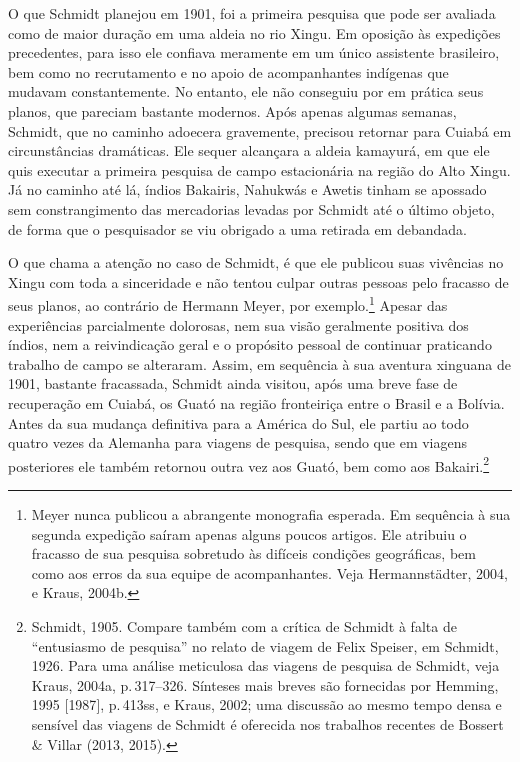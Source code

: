 O que Schmidt planejou em 1901, foi a primeira pesquisa que pode ser
avaliada como de maior duração em uma aldeia no rio Xingu. Em oposição
às expedições precedentes, para isso ele confiava meramente em um único
assistente brasileiro, bem como no recrutamento e no apoio de
acompanhantes indígenas que mudavam constantemente. No entanto, ele não
conseguiu por em prática seus planos, que pareciam bastante modernos.
Após apenas algumas semanas, Schmidt, que no caminho adoecera
gravemente, precisou retornar para Cuiabá em circunstâncias dramáticas.
Ele sequer alcançara a aldeia kamayurá, em que ele quis executar a
primeira pesquisa de campo estacionária na região do Alto Xingu. Já no
caminho até lá, índios Bakairis, Nahukwás e Awetis tinham se apossado sem
constrangimento das mercadorias levadas por Schmidt até o último objeto,
de forma que o pesquisador se viu obrigado a uma retirada em debandada.

O que chama a atenção no caso de Schmidt, é que ele publicou suas
vivências no Xingu com toda a sinceridade e não tentou culpar outras
pessoas pelo fracasso de seus planos, ao contrário de Hermann Meyer, por
exemplo.\footnote{Meyer nunca publicou a abrangente monografia esperada.
  Em sequência à sua segunda expedição saíram apenas alguns poucos
  artigos. Ele atribuiu o fracasso de sua pesquisa sobretudo às
  difíceis condições geográficas, bem como aos erros da sua equipe de
  acompanhantes. Veja Hermannstädter, 2004, e Kraus, 2004b.} Apesar das
experiências parcialmente dolorosas, nem sua visão geralmente positiva
dos índios, nem a reivindicação geral e o propósito pessoal de
continuar praticando trabalho de campo se alteraram. Assim, em
sequência à sua aventura xinguana de 1901, bastante fracassada, Schmidt
ainda visitou, após uma breve fase de recuperação em Cuiabá, os Guató na
região fronteiriça entre o Brasil e a Bolívia. Antes da sua mudança
definitiva para a América do Sul, ele partiu ao todo quatro vezes da
Alemanha para viagens de pesquisa, sendo que em viagens posteriores ele
também retornou outra vez aos Guató, bem como aos Bakairi.\footnote{Schmidt,
  1905. Compare também com a crítica de Schmidt à falta de
  ``entusiasmo de pesquisa'' no relato de viagem de Felix Speiser, em
  Schmidt, 1926. Para uma análise meticulosa das viagens de pesquisa
  de Schmidt, veja Kraus, 2004a, p.\,317--326. Sínteses mais breves são
  fornecidas por Hemming, 1995 {[}1987{]}, p.\,413ss, e Kraus, 2002; uma
  discussão ao mesmo tempo densa e sensível das viagens de Schmidt é
  oferecida nos trabalhos recentes de Bossert \& Villar (2013, 2015).}

